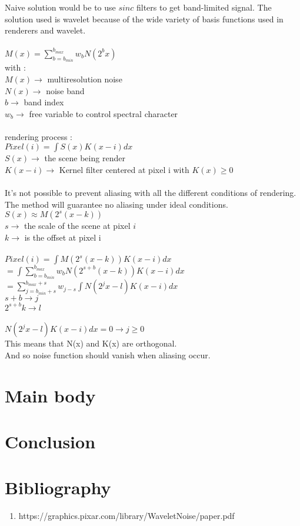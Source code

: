 \documentclass[11pt,a4paper]{article}
\begin{document}
Naive solution would be to use $sinc$ filters to get band-limited signal.
The solution used is wavelet because of the wide variety of basis functions used in renderers and wavelet.
\\\\
$M(x) = \sum\limits_{b=b_{min}}^{b_{max}} w_{b}N(2^{b}x)$
\\
with :
\\
$M(x)\rightarrow$  multiresolution noise
\\
$N(x)\rightarrow$ noise band
\\
$b\rightarrow$ band index
\\
$w_{b}\rightarrow$ free variable to control spectral character
\\
\\
rendering process :
\\
$Pixel(i) = \int S(x)K(x-i)dx$
\\
$S(x)\rightarrow$ the scene being render
\\
$K(x-i)\rightarrow$ Kernel filter centered at pixel i with $K(x) \geq 0$ 
\\
\\
It's not possible to prevent aliasing with all the different conditions of rendering. The method will guarantee no aliasing under ideal conditions.
\\
$S(x)\approx M(2^s(x-k))$
\\
$s\rightarrow$ the scale of the scene at pixel $i$
\\
$k\rightarrow$ is the offset at pixel i
\\\\
$Pixel(i) = \int M(2^s(x-k))K(x-i)dx $ 
\\
$ = \int\sum\limits_{b=b_{min}}^{b_{max}} w_{b}N(2^{s+b}(x-k))K(x-i)dx$
\\
$ = \sum\limits_{j=b_{min}+s}^{b_{max}+s} w_{j-s} \int N(2^{j}x-l)K(x-i)dx $
\\
$s+b\rightarrow j$
\\
$2^{s+b}k\rightarrow l$
\\\\
$N(2^{j}x-l)K(x-i)dx = 0 \rightarrow j\geq0 $
\\
This means that N(x) and K(x) are orthogonal.
\\
And so noise function should vanish when aliasing occur.
\\


\section{Main body}



\section{Conclusion}



\section{Bibliography}

\begin{enumerate}
\item https://graphics.pixar.com/library/WaveletNoise/paper.pdf
\end{enumerate}
\end{document}
